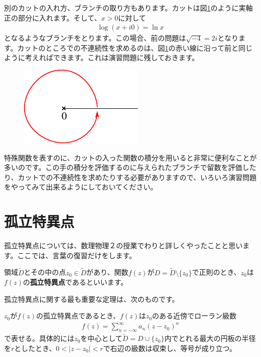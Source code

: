\documentclass[report,paper=a4, fontsize=12pt, line_length=16cm, number_of_lines=33,dvipdfmx]{jlreq}
\numberwithin{equation}{section}
\newcommand{\strong}[1]{\textsf{\bfseries #1}}
\begin{document}
別のカットの入れ方、ブランチの取り方もあります。カットは図\ref{fig:cutrealpositive}のように実軸正の部分に入れます。そして、$x>0$に対して
\begin{align}
  \log(x+i0)=\ln x \label{cutrealpositivebranch}
\end{align}
となるようなブランチをとります。この場合、前の問題は$\sqrt{-4}=2i$となります。カットのところでの不連続性を求めるのは、図\ref{fig:cutrealpositive}の赤い線に沿って前と同じように考えればできます。これは演習問題に残しておきます。
\begin{figure}[htbp]
  \centering
  \includegraphics{cutrealpositive.pdf}
  \caption{}
  \label{fig:cutrealpositive}
\end{figure}

特殊関数を表すのに、カットの入った関数の積分を用いると非常に便利なことが多いのです。この手の積分を評価するのに与えられたブランチで留数を評価したり、カットでの不連続性を求めたりする必要がありますので、いろいろ演習問題をやってみて出来るようにしておいてください。

\section{孤立特異点}
孤立特異点については、数理物理２の授業でわりと詳しくやったことと思います。ここでは、言葉の復習だけをします。

領域$\widetilde{D}$とその中の点$z_0\in \widetilde{D}$があり、関数$f(z)$が$D=\widetilde{D}\setminus \{z_0\}$で正則のとき、$z_0$は$f(z)$の\strong{孤立特異点}であるといいます。

孤立特異点に関する最も重要な定理は、次のものです。
\begin{theor}{}{}
  $z_0$が$f(z)$の孤立特異点であるとき、$f(z)$は$z_0$のある近傍でローラン級数
  \begin{align}
    f(z)=\sum_{n=-\infty}^{\infty}a_n (z-z_0)^n \label{Laurentexpansion}
  \end{align}
  で表せる。具体的には$z_0$を中心として$\widetilde{D}=D\cup \{z_0\}$内でとれる最大の円板の半径を$r$としたとき、$0<|z-z_0|<r$で右辺の級数は収束し、等号が成り立つ。
\end{theor}
\end{document}

